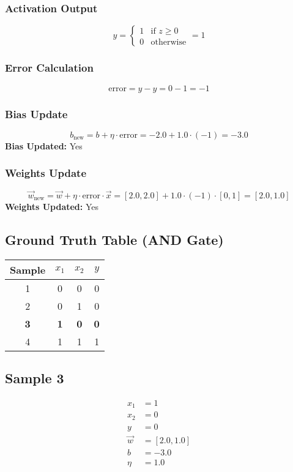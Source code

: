 \documentclass{article}
\begin{document}
\subsubsection*{Activation Output}
\[
\hat{y} =
\begin{cases}
1 & \text{if } z \geq 0 \\
0 & \text{otherwise}
\end{cases}
= 1
\]

\subsubsection*{Error Calculation}
\[
\text{error} = y - \hat{y} = 0 - 1 = -1
\]

\subsubsection*{Bias Update}
\[
b_{\text{new}} = b + \eta \cdot \text{error} = -2.0 + 1.0 \cdot (-1) = -3.0
\]
\textbf{Bias Updated:} Yes

\subsubsection*{Weights Update}
\[
\vec{w}_{\text{new}} = \vec{w} + \eta \cdot \text{error} \cdot \vec{x} = 
[2.0, 2.0] + 1.0 \cdot (-1) \cdot [0, 1] = 
[2.0, 1.0]
\]
\textbf{Weights Updated:} Yes

\subsection*{Ground Truth Table (AND Gate)}
\begin{center}
\begin{tabular}{|c|c|c|c|}
\hline
\textbf{Sample} & $x_1$ & $x_2$ & $y$ \\
\hline
1 & 0 & 0 & 0 \\
\hline
2 & 0 & 1 & 0 \\
\hline
\rowcolor{yellow} \textbf{3} & \textbf{1} & \textbf{0} & \textbf{0} \\
\hline
4 & 1 & 1 & 1 \\
\hline
\end{tabular}
\end{center}

\subsection*{Sample 3}
\begin{align*}
x_1 &= 1 \\
x_2 &= 0 \\
y &= 0 \\
\vec{w} &= [2.0, 1.0] \\
b &= -3.0 \\
\eta &= 1.0
\end{align*}
\end{document}
